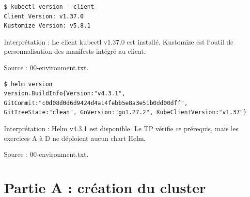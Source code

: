 \documentclass[11pt,a4paper]{article}
\begin{document}
\par\medskip\noindent\begin{minipage}{\linewidth}
\par\vspace{4pt}\noindent\begin{minipage}{\linewidth}
\begin{Verbatim}[breaklines=true,breakanywhere=true,fontsize=\footnotesize,frame=single,framesep=8pt,rulecolor=\color{teal}]
$ kubectl version --client
Client Version: v1.37.0
Kustomize Version: v5.8.1
\end{Verbatim}
\end{minipage}\par\vspace{6pt}

Interprétation : Le client kubectl v1.37.0 est installé. Kustomize est l'outil de personnalisation des manifests intégré au client.

{\footnotesize\color{teal} Source : 00-environment.txt.\par}
\end{minipage}\par\medskip

\par\medskip\noindent\begin{minipage}{\linewidth}
\par\vspace{4pt}\noindent\begin{minipage}{\linewidth}
\begin{Verbatim}[breaklines=true,breakanywhere=true,fontsize=\footnotesize,frame=single,framesep=8pt,rulecolor=\color{teal}]
$ helm version
version.BuildInfo{Version:"v4.3.1", GitCommit:"c0d08d0d6d9424d4a14febb5e8a3e51b0dd00dff", GitTreeState:"clean", GoVersion:"go1.27.2", KubeClientVersion:"v1.37"}
\end{Verbatim}
\end{minipage}\par\vspace{6pt}

Interprétation : Helm v4.3.1 est disponible. Le TP vérifie ce prérequis, mais les exercices A à D ne déploient aucun chart Helm.

{\footnotesize\color{teal} Source : 00-environment.txt.\par}
\end{minipage}\par\medskip

\clearpage
{}\section{Partie A : création du cluster}
\end{document}
